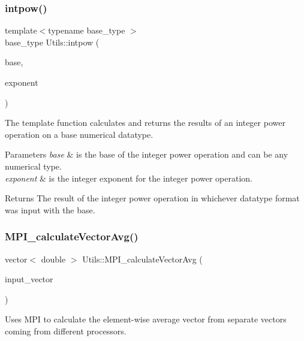 \subsubsection{\texorpdfstring{intpow()}{intpow()}}
{\footnotesize\ttfamily template$<$typename base\+\_\+type $>$ \\
base\+\_\+type Utils\+::intpow (\begin{DoxyParamCaption}\item[{const base\+\_\+type}]{base,  }\item[{const int}]{exponent }\end{DoxyParamCaption})}



The template function calculates and returns the results of an integer power operation on a base numerical datatype. 


\begin{DoxyParams}{Parameters}
{\em base} & is the base of the integer power operation and can be any numerical type. \\
\hline
{\em exponent} & is the integer exponent for the integer power operation. \\
\hline
\end{DoxyParams}
\begin{DoxyReturn}{Returns}
The result of the integer power operation in whichever datatype format was input with the base. 
\end{DoxyReturn}
\mbox{\label{namespace_utils_ac9a27519719bf1493bb2b4f56b0019c9}} 
\subsubsection{\texorpdfstring{M\+P\+I\+\_\+calculate\+Vector\+Avg()}{MPI\_calculateVectorAvg()}}
{\footnotesize\ttfamily vector$<$ double $>$ Utils\+::\+M\+P\+I\+\_\+calculate\+Vector\+Avg (\begin{DoxyParamCaption}\item[{const vector$<$ double $>$ \&}]{input\+\_\+vector }\end{DoxyParamCaption})}



Uses M\+PI to calculate the element-\/wise average vector from separate vectors coming from different processors. 

